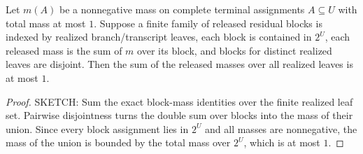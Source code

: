 \begin{helper}
Let \(m(A)\) be a nonnegative mass on complete terminal assignments
\(A\subseteq U\) with total mass at most \(1\).  Suppose a finite family of
released residual blocks is indexed by realized branch/transcript leaves,
each block is contained in \(2^U\), each released mass is the sum of \(m\)
over its block, and blocks for distinct realized leaves are disjoint.  Then
the sum of the released masses over all realized leaves is at most \(1\).
\end{helper}
\begin{proof}
SKETCH:
Sum the exact block-mass identities over the finite realized leaf set.
Pairwise disjointness turns the double sum over blocks into the mass of their
union.  Since every block assignment lies in \(2^U\) and all masses are
nonnegative, the mass of the union is bounded by the total mass over
\(2^U\), which is at most \(1\).
\end{proof}

